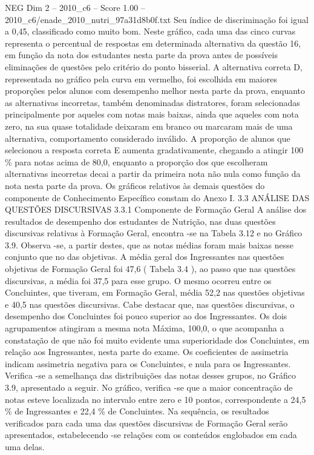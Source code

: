 \begin{textsample}{NEG Dim 2 – 2010\_c6 – Score 1.00 – 2010\_c6/enade\_2010\_nutri\_97a31d8b0f.txt}
Seu índice de discriminação foi igual a 0,45, classificado como muito bom.
Neste gráfico, cada uma das cinco curvas representa o percentual de respostas em determinada alternativa da questão 16, em função da nota dos estudantes nesta parte da prova antes de possíveis eliminações de questões pelo critério do ponto bisserial.
A alternativa correta D, representada no gráfico pela curva em vermelho, foi escolhida em maiores proporções pelos alunos com desempenho melhor nesta parte da prova, enquanto as alternativas incorretas, também denominadas distratores, foram selecionadas principalmente por aqueles com notas mais baixas, ainda que aqueles com nota zero, na sua quase totalidade deixaram em branco ou marcaram mais de uma alternativa, comportamento considerado inválido.
A proporção de alunos que selecionou a resposta correta E aumenta gradativamente, chegando a atingir 100 \% para notas acima de 80,0, enquanto a proporção dos que escolheram alternativas incorretas decai a partir da primeira nota não nula como função da nota nesta parte da prova.
Os gráficos relativos às demais questões do componente de Conhecimento Específico constam do Anexo I. 3.3 ANÁLISE DAS QUESTÕES DISCURSIVAS 3.3.1 Componente de Formação Geral A análise dos resultados de desempenho dos estudantes de Nutrição, nas duas questões discursivas relativas à Formação Geral, encontra -se na Tabela 3.12 e no Gráfico 3.9.
Observa -se, a partir destes, que as notas médias foram mais baixas nesse conjunto que no das objetivas.
A média geral dos Ingressantes nas questões objetivas de Formação Geral foi 47,6 ( Tabela 3.4 ), ao passo que nas questões discursivas, a média foi 37,5 para esse grupo.
O mesmo ocorreu entre os Concluintes, que tiveram, em Formação Geral, média 52,2 nas questões objetivas e 40,5 nas questões discursivas.
Cabe destacar que, nas questões discursivas, o desempenho dos Concluintes foi pouco superior ao dos Ingressantes.
Os dois agrupamentos atingiram a mesma nota Máxima, 100,0, o que acompanha a constatação de que não foi muito evidente uma superioridade dos Concluintes, em relação aos Ingressantes, nesta parte do exame.
Os coeficientes de assimetria indicam assimetria negativa para os Concluintes, e nula para os Ingressantes.
Verifica -se a semelhança das distribuições das notas desses grupos, no Gráfico 3.9, apresentado a seguir.
No gráfico, verifica -se que a maior concentração de notas esteve localizada no intervalo entre zero e 10 pontos, correspondente a 24,5 \% de Ingressantes e 22,4 \% de Concluintes.
Na sequência, os resultados verificados para cada uma das questões discursivas de Formação Geral serão apresentados, estabelecendo -se relações com os conteúdos englobados em cada uma delas.

\end{textsample}
